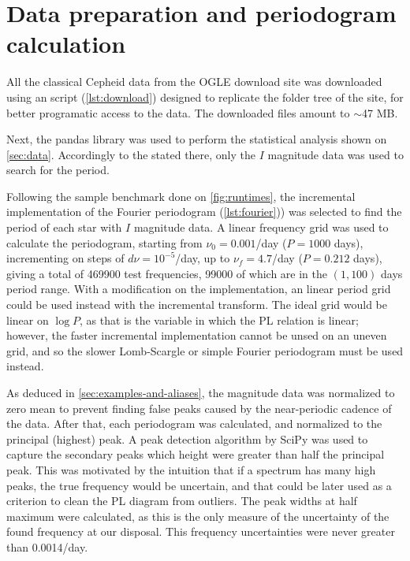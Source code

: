 
\section{Data preparation and periodogram calculation}

All the classical Cepheid data from the OGLE download site was downloaded using an script (\autoref{lst:download})
designed to replicate the folder tree of the site, for better programatic access to the data.
The downloaded files amount to $\sim$47 MB.

Next, the pandas library \citep{pandas} was used to perform the statistical analysis shown on \autoref{sec:data}.
Accordingly to the stated there, only the $I$ magnitude data was used to search for the period.

Following the sample benchmark done on \autoref{fig:runtimes}, 
the incremental implementation of the Fourier periodogram (\autoref{lst:fourier})) was selected to find the period of each star with $I$ magnitude data.
A linear frequency grid was used to calculate the periodogram, starting from $\nu_0=0.001$/day ($P= 1000$ days), 
incrementing on steps of $d\nu = 10^{-5}$/day, up to $\nu_f=4.7$/day ($P=0.212$ days), giving a total of 469900 test frequencies, 
99000 of which are in the $(1,100)$ days period range.
With a modification on the implementation, an linear period grid could be used instead with the incremental transform.
The ideal grid would be linear on $\log P$, as that is the variable in which the PL relation is linear; 
however, the faster incremental implementation cannot be unsed on an uneven grid, and so the slower Lomb-Scargle or simple Fourier periodogram must be used instead.

As deduced in \autoref{sec:examples-and-aliases}, 
the magnitude data was normalized to zero mean to prevent finding false peaks caused by the near-periodic cadence of the data.
After that, each periodogram was calculated, and normalized to the principal (highest) peak.
A peak detection algorithm by SciPy \citep{scipy} was used to capture the secondary peaks which height were greater than half the principal peak.
This was motivated by the intuition that if a spectrum has many high peaks, 
the true frequency would be uncertain, and that could be later used as a criterion to clean the PL diagram from outliers.
The peak widths at half maximum were calculated, as this is the only measure of the uncertainty of the found frequency at our disposal.
This frequency uncertainties were never greater than 0.0014/day.

